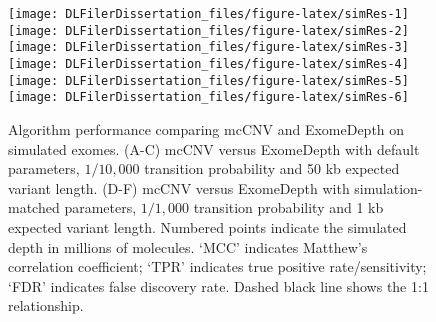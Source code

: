 \documentclass[11pt,letterpaper]{book}
\begin{document}
\begin{figure}

{\centering \texttt{[image: DLFilerDissertation\_files/figure-latex/simRes-1]} \texttt{[image: DLFilerDissertation\_files/figure-latex/simRes-2]} \texttt{[image: DLFilerDissertation\_files/figure-latex/simRes-3]} \texttt{[image: DLFilerDissertation\_files/figure-latex/simRes-4]} \texttt{[image: DLFilerDissertation\_files/figure-latex/simRes-5]} \texttt{[image: DLFilerDissertation\_files/figure-latex/simRes-6]} 

}

\caption[Algorithm performance comparing mcCNV and ExomeDepth on simulated exomes.]{Algorithm performance comparing mcCNV and ExomeDepth on simulated exomes. (A-C) mcCNV versus ExomeDepth with default parameters, \(1/10,000\) transition probability and 50 kb expected variant length. (D-F) mcCNV versus ExomeDepth with simulation-matched parameters, \(1/1,000\) transition probability and 1 kb expected variant length. Numbered points indicate the simulated depth in millions of molecules. `MCC' indicates Matthew's correlation coefficient; `TPR' indicates true positive rate/sensitivity; `FDR' indicates false discovery rate. Dashed black line shows the 1:1 relationship.}\label{fig:simRes}
\end{figure}
\end{document}
